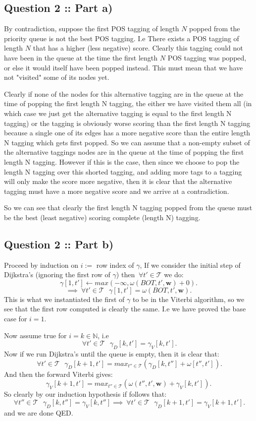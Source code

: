 \documentclass[a4paper]{article}
\begin{document}
\subsection*{Question 2 :: Part a)}
By contradiction, suppose the first POS tagging of length $N$ popped from
the priority queue is not the best POS tagging. I.e There exists
a POS tagging of length $N$ that has a higher (less negative) score.
Clearly this tagging could not have been in the queue at the time the first
length $N$ POS tagging was popped, or else it would itself have been popped instead.
This must mean that we have not "visited" some of its nodes yet.

Clearly if none of the nodes for this alternative tagging are in the queue at the time of popping the
first length N tagging, the either we have visited them all (in which case we just
get the alternative tagging is equal to the first length N tagging) or the tagging
is obviously worse scoring than the first length N tagging because a single
one of its edges has a more negative score than the entire length N tagging which gets first popped.
So we can assume that a non-empty subset of the alternative taggings nodes are in the queue
at the time of popping the first length N tagging. However if this is the case,
then since we choose to pop the length N tagging over this shorted tagging, and adding
more tags to a tagging will only make the score more negative, then it is clear
that the alternative tagging must have a more negative score and we arrive
at a contradiction.

So we can see that clearly the first length N tagging popped from the queue must be
the best (least negative) scoring complete (length N) tagging.

\subsection*{Question 2 :: Part b)}
Proceed by induction on $i :=$ row index of $\gamma$,
If we consider the initial step of Dijkstra's (ignoring the first row of $\gamma$)
then $~\forall t' \in \mathcal{T}$ we do:
\[
    \gamma[1, t'] \gets max(-\infty, \omega(BOT, t', \bm{w}) + 0)
.\]
\[
    \implies~\forall t' \in \mathcal{T} ~ ~ ~ \gamma[1, t'] = \omega(BOT, t', \bm{w})
.\]
This is what we instantiated the first of $\gamma$ to be in the Viterbi algorithm,
so we see that the first row computed is clearly the same. I.e we have proved
the base case for $i=1$.

Now assume true for  $i = k \in \mathbb{N}$, i.e
\[
    ~\forall t' \in \mathcal{T} ~ ~ ~ \gamma_D[k, t'] = \gamma_V[k, t']
.\]
Now if we run Dijkstra's until the queue is empty, then it is clear that:
\[
    ~\forall t' \in \mathcal{T} ~ ~ ~ \gamma_D[k+1, t'] = max_{t'' \in \mathcal{T}} (\gamma_D[k, t''] + \omega[t'', t'])
.\]
And then the forward Viterbi gives:
\[
    \gamma_V[k+1, t'] = max_{t'' \in \mathcal{T}}(\omega(t'', t', \bm{w}) + \gamma_V[k, t'])
.\]
So clearly by our induction hypothesis if follows that:
\[
    ~\forall t'' \in \mathcal{T} ~ ~ ~ \gamma_D[k, t''] = \gamma_V[k, t''] \implies
    ~\forall t' \in \mathcal{T} ~ ~ ~ \gamma_D[k+1, t'] = \gamma_V[k+1, t']
.\]
and we are done
QED.
\end{document}
